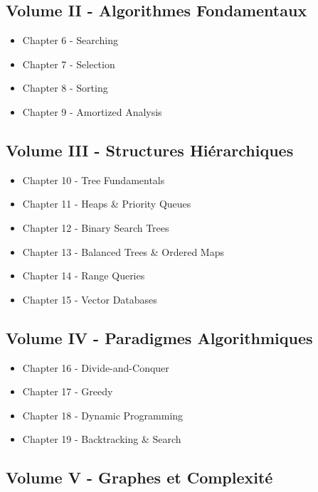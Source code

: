\documentclass[
  letterpaper,
  DIV=11,
  numbers=noendperiod]{scrreprt}
\providecommand{\tightlist}{%
  \setlength{\itemsep}{0pt}\setlength{\parskip}{0pt}}
\begin{document}
\subsection{Volume II - Algorithmes
Fondamentaux}\label{volume-ii---algorithmes-fondamentaux}

\begin{itemize}
\tightlist
\item
  Chapter 6 - Searching
\item
  Chapter 7 - Selection
\item
  Chapter 8 - Sorting
\item
  Chapter 9 - Amortized Analysis
\end{itemize}

\subsection{Volume III - Structures
Hiérarchiques}\label{volume-iii---structures-hiuxe9rarchiques}

\begin{itemize}
\tightlist
\item
  Chapter 10 - Tree Fundamentals
\item
  Chapter 11 - Heaps \& Priority Queues
\item
  Chapter 12 - Binary Search Trees
\item
  Chapter 13 - Balanced Trees \& Ordered Maps
\item
  Chapter 14 - Range Queries
\item
  Chapter 15 - Vector Databases
\end{itemize}

\subsection{Volume IV - Paradigmes
Algorithmiques}\label{volume-iv---paradigmes-algorithmiques}

\begin{itemize}
\tightlist
\item
  Chapter 16 - Divide-and-Conquer
\item
  Chapter 17 - Greedy
\item
  Chapter 18 - Dynamic Programming
\item
  Chapter 19 - Backtracking \& Search
\end{itemize}

\subsection{Volume V - Graphes et
Complexité}\label{volume-v---graphes-et-complexituxe9}
\end{document}
